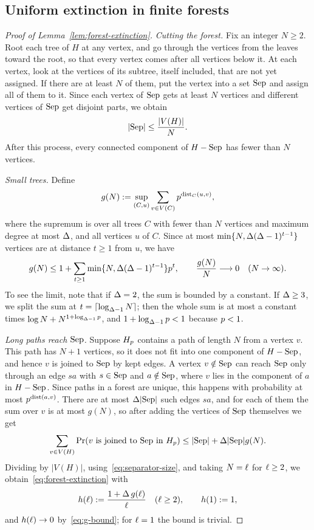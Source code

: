 \subsection{Uniform extinction in finite forests}

\begin{proof}[Proof of Lemma~\ref{lem:forest-extinction}]
\emph{Cutting the forest.} Fix an integer \(N\ge2\). Root each tree of \(H\) at
any vertex, and go through the vertices from the leaves toward the root, so
that every vertex comes after all vertices below it. At each vertex, look at
the vertices of its subtree, itself included, that are not yet assigned. If
there are at least \(N\) of them, put the vertex into a set \(\mathrm{Sep}\) and
assign all of them to it. Since each vertex of \(\mathrm{Sep}\) gets at least \(N\)
vertices and different vertices of \(\mathrm{Sep}\) get disjoint parts, we obtain
\begin{equation}\label{eq:separator-size}
  |\mathrm{Sep}|\le\frac{|V(H)|}{N}.
\end{equation}
After this process, every connected component of \(H-\mathrm{Sep}\) has fewer than
\(N\) vertices.

\emph{Small trees.} Define
\[
  g(N)
  :=\sup_{(C,u)}\sum_{v\in V(C)}p^{\operatorname{dist}_C(u,v)},
\]
where the supremum is over all trees \(C\) with fewer than \(N\) vertices and
maximum degree at most \(\Delta\), and all vertices \(u\) of \(C\). Since at most
\(\min\{N,\Delta(\Delta-1)^{t-1}\}\) vertices are at distance \(t\ge1\) from
\(u\), we have
\begin{equation}\label{eq:g-bound}
  g(N)
  \le
  1+\sum_{t\ge1}\min\{N,\Delta(\Delta-1)^{t-1}\}p^t ,
  \qquad
  \frac{g(N)}{N}\longrightarrow0\quad(N\to\infty).
\end{equation}
To see the limit, note that if \(\Delta=2\), the sum is bounded by a constant.
If \(\Delta\ge3\), we split the sum at \(t=\lceil\log_{\Delta-1}N\rceil\); then
the whole sum is at most a constant times
\(\log N+N^{1+\log_{\Delta-1}p}\), and \(1+\log_{\Delta-1}p<1\) because
\(p<1\).

\emph{Long paths reach \(\mathrm{Sep}\).} Suppose \(H_{p}\) contains a path
of length \(N\) from a vertex \(v\). This path has \(N+1\) vertices, so it does
not fit into one component of \(H-\mathrm{Sep}\), and hence \(v\) is joined to \(\mathrm{Sep}\)
by kept edges. A vertex \(v\notin\mathrm{Sep}\) can reach \(\mathrm{Sep}\) only through an
edge \(sa\) with \(s\in\mathrm{Sep}\) and \(a\notin\mathrm{Sep}\), where \(v\) lies in the
component of \(a\) in \(H-\mathrm{Sep}\). Since paths in a forest are unique, this
happens with probability at most \(p^{\operatorname{dist}(a,v)}\). There are at most
\(\Delta|\mathrm{Sep}|\) such edges \(sa\), and for each of them the sum over \(v\) is
at most \(g(N)\), so after adding the vertices of \(\mathrm{Sep}\) themselves we get
\[
  \sum_{v\in V(H)}
  \Prx{v\text{ is joined to }\sep\text{ in }\perc{H}{\keepp}}
  \le |\sep|+\degb|\sep|g(N).
\]
Dividing by \(|V(H)|\), using~\eqref{eq:separator-size}, and taking
\(N=\ell\) for \(\ell\ge2\), we obtain~\eqref{eq:forest-extinction} with
\[
  h(\ell)
  :=\frac{1+\Delta\,g(\ell)}{\ell}
  \quad(\ell\ge2),
  \qquad
  h(1):=1,
\]
and \(h(\ell)\to0\) by~\eqref{eq:g-bound}; for \(\ell=1\) the bound is
trivial.
\end{proof}
